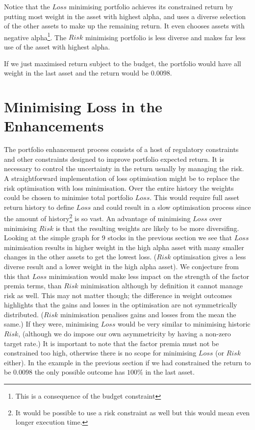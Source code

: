 \documentclass[12pt]{article}
\begin{document}
\break
Notice that the $Loss$ minimising portfolio achieves its constrained return by putting most weight in the
asset with highest alpha, and uses a diverse selection of the other assets to make up the remaining 
return. It even chooses assets with negative alpha\footnote{This is a consequence of the budget constraint}. The $Risk$ minimising portfolio is less diverse and makes far less use of the asset with highest alpha.

If we just maximised return subject to the budget, the portfolio would have all weight in the last 
asset and the return would be $0.0098$.

\section{Minimising Loss in the Enhancements}
The portfolio enhancement process consists of a host of regulatory constraints and other constraints 
designed to improve portfolio expected return. It is necessary to control the uncertainty in the return usually 
by managing the risk.
A straightforward implementation of loss optimisation might be to replace the risk optimisation with loss minimisation.
Over the entire history the weights could be chosen to minimise total portfolio $Loss$.
This would require full asset return history to define $Loss$ and could 
result in a slow optimisation process since the amount of history\footnote{It would be possible 
to use a risk constraint as well but this would mean even longer execution time.} is so vast.  An advantage of
minimising $Loss$ over minimising $Risk$ is that the resulting weights are likely
to be more diversifing. Looking at the simple graph for 9 stocks in the previous section we see that
$Loss$ minimisation results in higher weight in the high alpha asset with many 
smaller changes in the other assets to get the lowest loss. ($Risk$ optimisation gives a less diverse
result and a lower weight in the high alpha asset). We conjecture from this that $Loss$ minimisation 
would make less impact on the strength of the factor premia terms, than $Risk$ minimisation although by definition it cannot
manage risk as well. This may not matter though; the difference in weight outcomes
highlights that the gains and losses in the optimisation are not symmetrically
distributed. ($Risk$ minimisation penalises gains and losses from the mean the same.) If they were, minimising $Loss$ would be very similar to minimising historic $Risk$, (although
we do impose our own asymmetricity by having a non-zero target rate.) It is important
to note that the factor premia must not be constrained too high, otherwise there is no scope 
for minimising $Loss$ (or $Risk$ either). In the example in the previous section 
if we had constrained the return to be $0.0098$ the only possible outcome has $100\%$ in 
the last asset.
\end{document}
